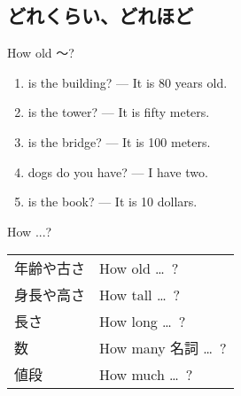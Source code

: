 \documentclass[aspectratio=169,xcolor={dvipsnames,table}]{beamer}
\begin{document}
\subsection{ どれくらい、どれほど}
\begin{frame}[plain]{How old 〜?}
 \begin{enumerate}
  \item {} is the building? --- It is 80 years old.%
\hfill{}
  \item {}is the tower? --- It is fifty meters.%
\hfill{}
  \item {} is the bridge? --- It is 100 meters.
\hfill{}
  \item {} dogs do you have? --- I have two.
\hfill{}
  \item {} is the book? --- It is 10 dollars.
\hfill{}
 \end{enumerate}


\hfill{}

\end{frame}
\begin{frame}[plain]{How ...?}
 
 \begin{center}
\begin{tabular}{ll}\toprule
年齢や古さ& How old \ldots{}\, ?\\
身長や高さ& How tall \ldots{}\, ?\\
長さ&How long \ldots{}\, ?\\
数&How many 名詞 \ldots{}\, ?\\
値段&How much \ldots{}\, ?\\
\bottomrule
\end{tabular}
\end{center}
\end{frame}
\end{document}
